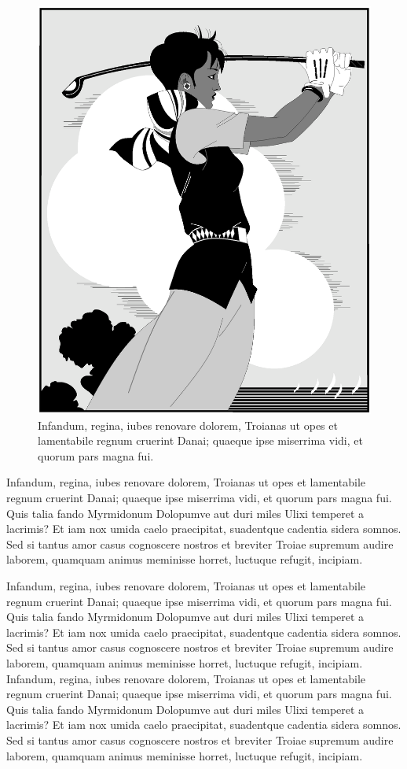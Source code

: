 \documentclass[
   \selectedoptions
  ]
  {aipproc}
\begin{document}
\begin{figure}
\caption{Infandum, regina, iubes renovare dolorem, Troianas ut opes et
         lamentabile regnum cruerint Danai; quaeque ipse miserrima
         vidi, et quorum pars magna fui.}
\includegraphics[height=.5\textheight]{golfer}
\end{figure}

Infandum, regina, iubes renovare dolorem, Troianas ut opes et
lamentabile regnum cruerint Danai; quaeque ipse miserrima vidi, et
quorum pars magna fui. Quis talia fando Myrmidonum Dolopumve aut duri
miles Ulixi temperet a lacrimis? Et iam nox umida caelo praecipitat,
suadentque cadentia sidera somnos. Sed si tantus amor casus
cognoscere nostros et breviter Troiae supremum audire laborem,
quamquam animus meminisse horret, luctuque refugit, incipiam.


Infandum, regina, iubes renovare dolorem, Troianas ut opes et
lamentabile regnum cruerint Danai; quaeque ipse miserrima vidi, et
quorum pars magna fui. Quis talia fando Myrmidonum Dolopumve aut duri
miles Ulixi temperet a lacrimis? Et iam nox umida caelo praecipitat,
suadentque cadentia sidera somnos. Sed si tantus amor casus
cognoscere nostros et breviter Troiae supremum audire laborem,
quamquam animus meminisse horret, luctuque refugit, incipiam.
Infandum, regina, iubes renovare dolorem, Troianas ut opes et
lamentabile regnum cruerint Danai; quaeque ipse miserrima vidi, et
quorum pars magna fui. Quis talia fando Myrmidonum Dolopumve aut duri
miles Ulixi temperet a lacrimis? Et iam nox umida caelo praecipitat,
suadentque cadentia sidera somnos. Sed si tantus amor casus
cognoscere nostros et breviter Troiae supremum audire laborem,
quamquam animus meminisse horret, luctuque refugit, incipiam.
\end{document}
